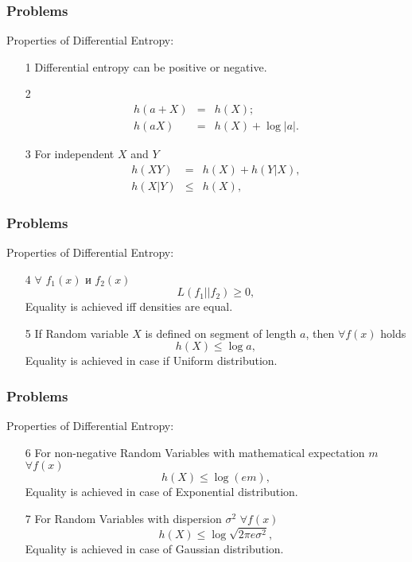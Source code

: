 \documentclass[14pt]{beamer}
\begin{document}
\begin{frame}
\frametitle{Problems}
Properties of Differential Entropy:
\begin{enumerate}

    \item[1] \label{pr6_1} Differential entropy can be positive or negative.
    
    \pause
    \item[2] \label{pr6_2}
    \[
    \begin{array}{lll}
    h(a+X)&=&h(X);\\
    h(aX)&=&h(X)+\log |a|.
    \end{array}
    \]
    
    \pause    
    \item[3] \label{pr6_3} For independent $X$ and $Y$
    \[
    \begin{array}{lll}
    h(XY)&=&h(X)+h(Y|X),\\
     h(X|Y)&\le& h(X),
    \end{array}
    \]
    
\end{enumerate}
\end{frame}


\begin{frame}
\frametitle{Problems}
Properties of Differential Entropy:
\begin{enumerate}
    
    \item[4] \label{pr6_4} $\forall$ \quad $f_1(x)$ и  $f_2(x)$
    \[
    L(f_1||f_2) \ge 0,
    \]
    Equality is achieved iff densities are equal.
    
    
    \pause
    \item[5] \label{pr6_5} If Random variable $X$ is defined on segment of length $a$, then $\forall f(x)$ holds 
    \[
    h(X) \le \log a,
    \]
    Equality is achieved in case if Uniform distribution.


\end{enumerate}
\end{frame}


\begin{frame}
\frametitle{Problems}
Properties of Differential Entropy:
\begin{enumerate}
    
    \item[6] \label{pr6_6} For non-negative Random Variables with mathematical expectation $m$ $\forall f(x)$
    \[
    h(X) \le \log(em),
    \]
    Equality is achieved in case of Exponential distribution.

    \pause
    \item[7] \label{pr6_7} For Random Variables with dispersion $\sigma^2$ $\forall f(x)$
    \[
    h(X) \le \log \sqrt{2\pi e \sigma^2},
    \]
    Equality is achieved in case of Gaussian distribution.

\end{enumerate}
\end{frame}
\end{document}
